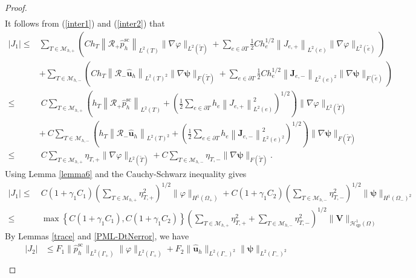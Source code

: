 \documentclass[final,3p,times]{elsarticle}
\begin{document}
\begin{proof}
\begin{align*}
	\end{align*}
	It follows from (\ref{inter1}) and (\ref{inter2}) that
	\begin{align*}
		|{J}_1| \leq& \sum_{T \in \mathscr{M}_{h, +}}\left(Ch_T\left\|\mathcal{R}_+\hat{p}^{\mathrm{sc}}_h\right\|_{L^2(T)}\|\nabla \varphi\|_{L^2(\tilde{T})}+\sum_{e \in \partial T} \frac{1}{2} Ch_e^{1 / 2}\left\|J_{e, +}\right\|_{L^2(e)}\|\nabla \varphi\|_{L^2(\tilde{e})}\right) \\
		&+  \sum_{T \in \mathscr{M}_{h, -}}\left(Ch_T\left\|\mathcal{R}_- \hat{\boldsymbol{u}}_h\right\|_{L^2(T)^2}\|\nabla \boldsymbol{\psi}\|_{F(\tilde{T})}+\sum_{e \in \partial T} \frac{1}{2} C h_e^{1 / 2}\left\|\boldsymbol{J}_{e,-}\right\|_{L^2(e)^2}\|\nabla \boldsymbol{\psi}\|_{F(\tilde{e})}\right)\\
		\leq&~C\sum_{T \in \mathscr{M}_{h,+}} \left(h_T\left\|\mathcal{R}_+ \hat{p}^{\mathrm{sc}}_h\right\|_{L^2(T)}+\left(\frac{1}{2} \sum_{e \in \partial T} h_e\left\|J_{e, +}\right\|_{L^2(e)}^2\right)^{1 / 2}\right)\|\nabla \varphi\|_{L^2(\tilde{T})}\\
		& +~ C\sum_{T \in \mathscr{M}_{h, -}} \left(h_T\left\|\mathcal{R}_- \hat{\boldsymbol{u}}_h\right\|_{L^2(T)^2}+\left(\frac{1}{2} \sum_{e \in \partial T} h_e\left\|\boldsymbol{J}_{e, -}\right\|_{L^2(e)^2}^2\right)^{1 / 2}\right)\|\nabla \boldsymbol{\psi}\|_{F(\tilde{T})} \\
		\leq&~ C\sum_{T \in \mathscr{M}_{h,+}} \eta_{T,+}\|\nabla \varphi\|_{L^2(\tilde{T})} 
		+ C\sum_{T \in \mathscr{M}_{h,-}} \eta_{T,-}\|\nabla \boldsymbol{\psi}\|_{F(\tilde{T})}.
	\end{align*}
	Using Lemma \ref{lemma6} and the Cauchy-Schwarz inequality gives
	\begin{align*}
		|{J}_1|
		\leq&~ C(1+\gamma_1C_1)\left(\sum_{T \in \mathscr{M}_{h, +}} \eta_{T, +}^2\right)^{1 / 2}\|\varphi\|_{H^1\left(\Omega_+\right)}
		+  C(1+\gamma_1C_2)\left(\sum_{T \in \mathscr{M}_{h, -}} \eta_{T, -}^2\right)^{1 / 2}\|\boldsymbol{\psi}\|_{H^1\left(\Omega_-\right)^2}\\
		\leq&~ \max\left\{C(1+\gamma_1C_1),C(1+\gamma_1C_2)\right\}\left(\sum_{T \in \mathscr{M}_{h, +}} \eta_{T, +}^2+\sum_{T \in \mathscr{M}_{h, -}} \eta_{T, -}^2\right)^{1 / 2}\|\boldsymbol{V}\|_{\mathscr{H}^1_\mathrm{qp}(\Omega)}
	\end{align*}
	By Lemmas \ref{trace} and \ref{PML-DtNerror}, we have
	\begin{align*}
		|J_2| &\leq F_1\|\hat{p}^{\mathrm{sc}}_h \|_{L^2(\Gamma_+)}\|\varphi\|_{L^2(\Gamma_+)} + F_2\|\hat{\boldsymbol{u}}_h \|_{L^2(\Gamma_-)^2}\|\boldsymbol{\psi}\|_{L^2(\Gamma_-)^2} \\

\end{align*}
\end{proof}
\end{document}
